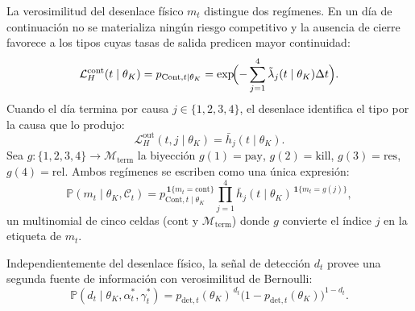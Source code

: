 \documentclass[pdflatex,sn-mathphys-ay]{sn-jnl}
\theoremstyle{thmstyleone}
\theoremstyle{thmstyletwo}
\theoremstyle{thmstylethree}
\newcommand{\Prob}{\mathbb{P}}
\newcommand{\1}{\mathbf{1}}
\begin{document}
La verosimilitud del desenlace físico $m_t$ distingue dos regímenes. En un día de continuación no se materializa ningún riesgo competitivo y la ausencia de cierre favorece a los tipos cuyas tasas de salida predicen mayor continuidad:
\begin{equation}
\mathcal{L}_H^{\mathrm{cont}}(t\mid\theta_K)=p_{\mathrm{Cont},t\mid\theta_K}=\exp\!\Bigl(-\sum_{j=1}^{4}\tilde{\lambda}_j(t\mid\theta_K)\Delta t\Bigr).
\label{eq:LH-cont}
\end{equation}
Cuando el día termina por causa $j\in\{1,2,3,4\}$, el desenlace identifica el tipo por la causa que lo produjo:
\begin{equation}
\mathcal{L}_H^{\mathrm{out}}(t,j\mid\theta_K)=\bar h_{j}(t\mid\theta_K).
\label{eq:LH-out}
\end{equation}
Sea $g:\{1,2,3,4\}\to\mathcal{M}_{\mathrm{term}}$ la biyección $g(1)=\mathrm{pay}$, $g(2)=\mathrm{kill}$, $g(3)=\mathrm{res}$, $g(4)=\mathrm{rel}$. Ambos regímenes se escriben como una única expresión:
\begin{equation}
\Prob(m_t\mid\theta_K,\mathcal{C}_t)=p_{\mathrm{Cont},t\mid\theta_K}^{\,\mathbf{1}\{m_t=\mathrm{cont}\}}\prod_{j=1}^{4}\bar h_j(t\mid\theta_K)^{\,\mathbf{1}\{m_t=g(j)\}},
\label{eq:LH-compacta}
\end{equation}
un multinomial de cinco celdas ($\mathrm{cont}$ y $\mathcal{M}_{\mathrm{term}}$) donde $g$ convierte el índice $j$ en la etiqueta de $m_t$.

Independientemente del desenlace físico, la señal de detección $d_t$ provee una segunda fuente de información con verosimilitud de Bernoulli:
\begin{equation}
\Prob(d_t\mid\theta_K,\alpha_t^\ast,\gamma_t^\ast)=p_{\mathrm{det},t}(\theta_K)^{\,d_t}\bigl(1-p_{\mathrm{det},t}(\theta_K)\bigr)^{1-d_t}.
\label{eq:Ld-bernoulli}
\end{equation}
\end{document}
